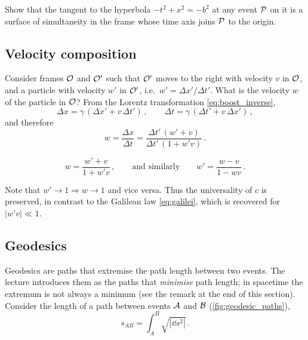 \begin{exercise}
    Show that the tangent to the hyperbola $-t^2 + x^2 = -b^2$ at any event $\mathcal{P}$ on it is a
    surface of simultaneity in the frame whose time axis joins $\mathcal{P}$ to the origin.
\end{exercise}

\subsection{Velocity composition}
\label{sec:sr_velocity}

Consider frames $\mathcal{O}$ and $\mathcal{O}'$ such that $\mathcal{O}'$ moves to the right with velocity $v$ in
$\mathcal{O}$, and a particle with velocity $w'$ in $\mathcal{O}'$, i.e.\ $w' = \Delta x' / \Delta t'$. What is
the velocity $w$ of the particle in $\mathcal{O}$? From the Lorentz transformation
\eqref{eq:boost_inverse},
\begin{equation}
    \Delta x = \gamma\,(\Delta x' + v\,\Delta t') \, , \qquad
    \Delta t = \gamma\,(\Delta t' + v\,\Delta x') \, ,
\end{equation}
and therefore
\begin{equation}
    w = \frac{\Delta x}{\Delta t} = \frac{\Delta t'\,(w' + v)}{\Delta t'\,(1 + w' v)} \, .
\end{equation}
\begin{keyresult}
    \begin{equation}
        w = \frac{w' + v}{1 + w' v} \, , \qquad\text{and similarly}\qquad
        w' = \frac{w - v}{1 - w v} \, .
        \label{eq:velocity_composition}
    \end{equation}
\end{keyresult}
Note that $w' \to 1 \Rightarrow w \to 1$ and vice versa. Thus the universality of $c$ is
preserved, in contrast to the Galilean law \eqref{eq:galilei}, which is recovered for
$|w' v| \ll 1$.


\subsection{Geodesics}
\label{sec:sr_geodesics}

Geodesics are paths that extremise the path length between two events. The lecture introduces
them as the paths that \emph{minimise} path length; in spacetime the extremum is not always a
minimum (see the remark at the end of this section). Consider the length of a path between
events $\mathcal{A}$ and $\mathcal{B}$ (\cref{fig:geodesic_paths}),
\begin{equation}
    s_{AB} = \int_A^B \sqrt{|\dd s^2|} \, .
\end{equation}

